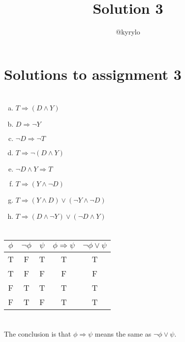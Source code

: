 \documentclass{article}
\title{Solution 3}
\author{@kyrylo}
\begin{document}
\section*{Solutions to assignment 3}

\section{}

\begin{enumerate}[(a)]
\item $T \Rightarrow (D \wedge Y)$
\item $D \Rightarrow \neg Y$
\item $\neg D \Rightarrow \neg T$
\item $T \Rightarrow \neg (D \wedge Y)$
\item $\neg D \wedge Y \Rightarrow T$
\item $T \Rightarrow (Y \wedge \neg D)$
\item $T \Rightarrow (Y \wedge D) \vee (\neg Y \wedge \neg D)$
\item $T \Rightarrow (D \wedge \neg Y) \vee (\neg D \wedge Y)$
\end{enumerate}

\section{}

\begin{tabular}{ | c | c | c | c | c | }
  \hline
  $\phi$ & $\neg \phi$ & $\psi$ & $\phi \Rightarrow \psi$ & $\neg \phi \vee \psi$ \\
  \hline
  T & F & T & T & T \\
  T & F & F & F & F \\
  F & T & T & T & T \\
  F & T & F & T & T \\
  \hline
\end{tabular}

\section{}

The conclusion is that $\phi \Rightarrow \psi$ means the same as $\neg \phi \vee \psi$.

\section{}
\end{document}
